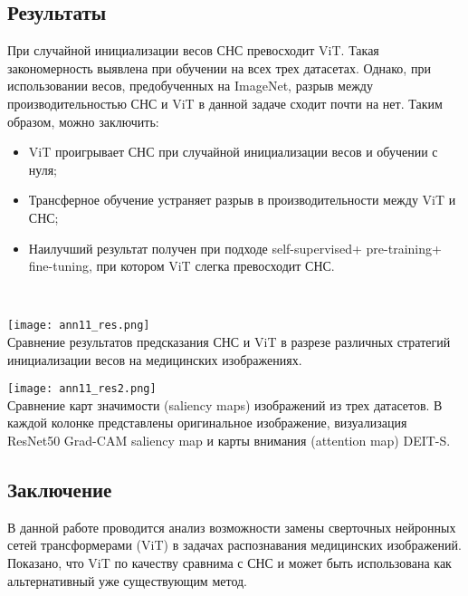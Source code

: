 \subsection*{Результаты}
При случайной инициализации весов СНС превосходит ViT. Такая 
закономерность выявлена при обучении на всех трех датасетах.
Однако, при использовании весов, предобученных на ImageNet, 
разрыв между производительностью СНС и ViT в данной задаче 
сходит почти на нет.  Таким образом, можно заключить:
\begin{itemize}
    \item ViT проигрывает СНС при случайной инициализации 
    весов и обучении с нуля;
    \item Трансферное обучение устраняет разрыв в производительности
    между ViT и СНС;
    \item Наилучший результат получен при подходе self-supervised+
    pre-training+ fine-tuning, при котором ViT слегка превосходит СНС.
\end{itemize}

\\

\begin{minipage}{1.0\linewidth}
    \begin{center}
        \texttt{[image: ann11\_res.png]} \\
        \caption{\scriptsize{Сравнение результатов предсказания СНС и ViT в разрезе различных стратегий инициализации весов 
        на медицинских изображениях.}}
    \end{center}
    
\end{minipage}

\begin{minipage}{1.0\linewidth}
    \begin{center}
        \texttt{[image: ann11\_res2.png]} \\
        \caption{\scriptsize{Сравнение карт значимости (saliency maps) изображений из трех датасетов. В каждой колонке 
        представлены оригинальное изображение, визуализация ResNet50 Grad-CAM saliency map и карты внимания (attention map) DEIT-S.}}
    \end{center}
    
\end{minipage}

\subsection*{Заключение}
В данной работе проводится анализ возможности замены сверточных
нейронных сетей трансформерами (ViT) в задачах распознавания
медицинских изображений. Показано, что ViT по качеству сравнима 
с СНС и может быть использована как альтернативный уже существующим метод.